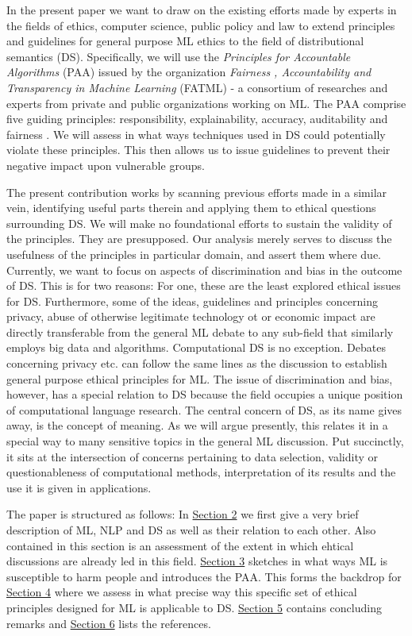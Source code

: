 \documentclass{article}
\begin{document}
In the present paper we want to draw on the existing efforts made by experts in the fields of ethics, computer science, public policy and law to extend principles  and guidelines for general purpose ML ethics to the field of distributional semantics (DS). Specifically, we will use the \emph{Principles for Accountable Algorithms} (PAA) issued by the organization \emph{Fairness , Accountability and Transparency in Machine Learning} (FATML) - a consortium of researches and experts from private and public organizations working on ML. 
The PAA comprise five guiding principles: responsibility, explainability, accuracy, auditability and fairness \cite{principles}.
We will assess in what ways techniques used in DS could potentially violate these principles. This then allows us to issue guidelines to prevent their negative impact upon vulnerable groups. 

The present contribution works by scanning previous efforts made in a similar vein, identifying useful parts therein and applying them to ethical questions surrounding DS. We will make no foundational efforts to sustain the validity of the principles. They are presupposed. Our analysis merely serves to discuss the usefulness of the principles in particular domain, and assert them where due.
Currently, we want to focus on aspects of discrimination and bias in the outcome of DS. This is for two reasons: For one, these are the least explored ethical issues for DS. Furthermore, some of the ideas, guidelines and principles concerning privacy, abuse of otherwise legitimate technology ot  or economic impact are directly transferable from the general ML debate to any sub-field that similarly employs big data and algorithms. Computational DS is no exception. Debates concerning privacy etc. can follow the same lines as the discussion to establish general purpose ethical principles for ML. The issue of discrimination and bias, however, has a special relation to DS because the field occupies a unique position of computational language research. The central concern of DS, as its name gives away, is the concept of meaning. As we will argue presently, this relates it in a special way to many sensitive topics in the general ML discussion. Put succinctly, it sits at the intersection of concerns pertaining to data selection, validity or questionableness of computational methods, interpretation of its results and the use it is given in applications.

The paper is structured as follows: In \hyperlink{sec2}{Section 2} we first give a very brief description of ML, NLP and DS as well as their relation to each other. Also contained in this section is an assessment of the extent in which ehtical discussions are already led in this field. \hyperlink{sec3}{Section 3} sketches in what ways ML is susceptible to harm people and introduces the PAA. This forms the backdrop for \hyperlink{sec4}{Section 4} where we assess in what precise way this specific set of ethical principles designed for ML is applicable to DS. \hyperlink{sec5}{Section 5} contains concluding remarks and \hyperlink{sec6}{Section 6} lists the references.
\end{document}
